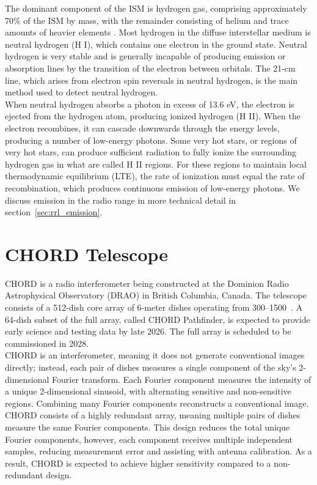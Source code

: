 The dominant component of the ISM is hydrogen gas, comprising approximately 70\% of the ISM by mass, with the remainder consisting of helium and trace amounts of heavier elements \cite{carrollIntroductionModernAstrophysics2017}. Most hydrogen in the diffuse interstellar medium is neutral hydrogen (H I), which contains one electron in the ground state. Neutral hydrogen is very stable and is generally incapable of producing emission or absorption lines by the transition of the electron between orbitals. The 21-cm line, which arises from electron spin reversals in neutral hydrogen, is the main method used to detect neutral hydrogen.\\

When neutral hydrogen absorbs a photon in excess of 13.6 eV, the electron is ejected from the hydrogen atom, producing ionized hydrogen (H II). When the electron recombines, it can cascade downwards through the energy levels, producing a number of low-energy photons. Some very hot stars, or regions of very hot stars, can produce sufficient radiation to fully ionize the surrounding hydrogen gas in what are called H II regions. For these regions to maintain local thermodynamic equilibrium (LTE), the rate of ionization must equal the rate of recombination, which produces continuous emission of low-energy photons. We discuss emission in the radio range in more technical detail in section~\ref{sec:rrl_emission}. \\



\section{CHORD Telescope}
CHORD is a radio interferometer being constructed at the Dominion Radio Astrophysical Observatory (DRAO) in British Columbia, Canada. The telescope consists of a 512-dish core array of 6-meter dishes operating from \mbox{300--1500}~\MHz. A 64-dish subset of the full array, called CHORD Pathfinder, is expected to provide early science and testing data by late 2026. The full array is scheduled to be commissioned in 2028.\\

CHORD is an interferometer, meaning it does not generate conventional images directly; instead, each pair of dishes measures a single component of the sky's 2-dimensional Fourier transform. Each Fourier component measures the intensity of a unique 2-dimensional sinusoid, with alternating sensitive and non-sensitive regions. Combining many Fourier components reconstructs a conventional image. CHORD consists of a highly redundant array, meaning multiple pairs of dishes measure the same Fourier components. This design reduces the total unique Fourier components, however, each component receives multiple independent samples, reducing measurement error and assisting with antenna calibration. As a result, CHORD is expected to achieve higher sensitivity compared to a non-redundant design.\\

